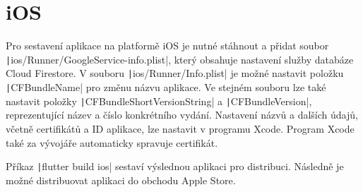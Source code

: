 \section{iOS}
 
Pro sestavení aplikace na platformě iOS je nutné stáhnout a přidat soubor
\texttt|ios/Runner/GoogleService-info.plist|,
který obsahuje nastavení služby databáze Cloud Firestore.
V souboru \texttt|ios/Runner/Info.plist|
je možné nastavit položku \texttt|CFBundleName|
pro změnu názvu aplikace.
Ve stejném souboru lze také nastavit položky
\texttt|CFBundleShortVersionString| a
\texttt|CFBundleVersion|,
reprezentující název a číslo konkrétního vydání.
Nastavení názvů a dalších údajů,
včetně certifikátů a ID aplikace,
lze nastavit v programu Xcode.
Program Xcode také za vývojáře automaticky
spravuje certifikát.~\cite{flutter_deploy_ios}

Příkaz \texttt|flutter build ios| sestaví výslednou aplikaci
pro distribuci.
Následně je možné distribuovat aplikaci do obchodu Apple Store.
